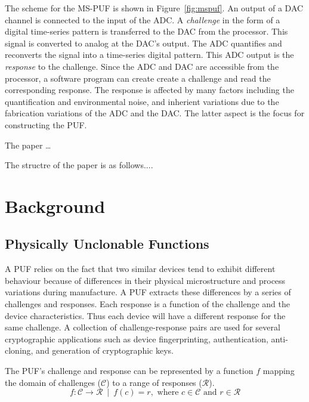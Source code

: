 The scheme for the MS-PUF is shown in Figure~\ref{fig:mspuf}. An output of a DAC channel
is connected to the input of the ADC. A {\em challenge} in the form of a
digital time-series pattern is transferred to the DAC from the processor. This signal is
converted to analog at the DAC's output. The ADC quantifies and reconverts the signal 
into a time-series digital pattern. This ADC output is the {\em response} to the challenge.
Since the ADC and DAC are accessible from the processor, a software program can create 
create a challenge and read the corresponding response. 
The response is affected by many factors including the quantification and environmental
noise, and inherient variations due to the fabrication variations of the ADC and the 
DAC. The latter aspect is the focus for constructing the PUF.




The paper \ldots


The structre of the paper is as follows....

%
%

\section{Background}
\subsection{Physically Unclonable Functions}
A PUF relies on the fact that two similar devices tend to exhibit
different behaviour because of differences in their physical microstructure
and process variations during manufacture. A PUF extracts these 
differences by a 
series of challenges and responses. Each response is a 
function of the challenge and the device characteristics. Thus each device will
have a different response for the same challenge. A collection of challenge-response pairs
are used for several cryptographic applications such as device fingerprinting, 
authentication, anti-cloning, and generation of cryptographic keys.


The PUF's challenge and response can be represented by a function $f$ 
mapping the domain of challenges ($\mathcal C$) to a range of responses ($\mathcal R$).
\begin{equation*}
f : \mathcal C \rightarrow \mathcal R \,\,\,
  | \,\,\, f(c) = r, \text{ where } c \in \mathcal C \text{ and } r \in \mathcal R
\end{equation*}

